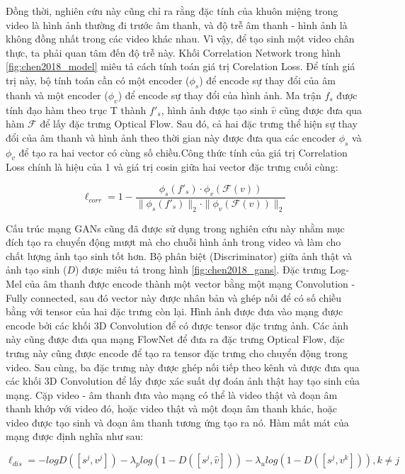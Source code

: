 Đồng thời, nghiên cứu này cũng chỉ ra rằng đặc tính của khuôn miệng trong video là hình ảnh thường đi trước âm thanh, và độ trễ âm thanh - hình ảnh là không đồng nhất trong các video khác nhau. Vì vậy, để tạo sinh một video chân thực, ta phải quan tâm đến độ trễ này. Khối Correlation Network trong hình \ref{fig:chen2018_model} miêu tả cách tính toán giá trị Corelation Loss. Để tính giá trị này, bộ tính toán cần có một encoder ($\phi_s$) để encode sự thay đổi của âm thanh và một encoder ($\phi_v$) để encode sự thay đổi của hình ảnh. Ma trận $f_s$ được tính đạo hàm theo trục T thành $f'_s$, hình ảnh được tạo sinh $\hat{v}$ cũng được đưa qua hàm $\mathcal{F}$ để lấy đặc trưng Optical Flow. Sau đó, cả hai đặc trưng thể hiện sự thay đổi của âm thanh và hình ảnh theo thời gian này được đưa qua các encoder $\phi_s$ và $\phi_v$ để tạo ra hai vector có cùng số chiều.Công thức tính của giá trị Correlation Loss chính là hiệu của 1 và giá trị cosin giữa hai vector đặc trưng cuối cùng:

\begin{equation}
    \ell_{corr} = 1 - \frac{\phi_s(f'_s)\cdot\phi_v(\mathcal{F}(v))}{\|\phi_s(f'_s)\|_2\cdot\|\phi_v(\mathcal{F}(v))\|_2}
    \label{eqn:chen2018_corr_loss}
\end{equation}


Cấu trúc mạng GANs cũng đã được sử dụng trong nghiên cứu này nhằm mục đích tạo ra chuyển động mượt mà cho chuỗi hình ảnh trong video và làm cho chất lượng ảnh tạo sinh tốt hơn. Bộ phân biệt (Discriminator) giữa ảnh thật và ảnh tạo sinh ($D$) được miêu tả trong hình \ref{fig:chen2018_gans}. Đặc trưng Log-Mel của âm thanh được encode thành một vector bằng một mạng Convolution - Fully connected, sau đó vector này được nhân bản và ghép nối để có số chiều bằng với tensor của hai đặc trưng còn lại. Hình ảnh được đưa vào mạng được encode bởi các khối 3D Convolution để có được tensor đặc trưng ảnh. Các ảnh này cũng được đưa qua mạng FlowNet để đưa ra đặc trưng Optical Flow, đặc trưng này cũng được encode để tạo ra tensor đặc trưng cho chuyển động trong video. Sau cùng, ba đặc trưng này được ghép nối tiếp theo kênh và được đưa qua các khối 3D Convolution để lấy được xác suất dự đoán ảnh thật hay tạo sinh của mạng. Cặp video - âm thanh đưa vào mạng có thể là video thật và đoạn âm thanh khớp với video đó, hoặc video thật và một đoạn âm thanh khác, hoặc video được tạo sinh và đoạn âm thanh tương ứng tạo ra nó. Hàm mất mát của mạng được định nghĩa như sau:

\begin{equation}
    \ell_{dis} = -logD([s^j, v^j]) - \lambda_plog(1 - D([s^j, \hat{v}])) - \lambda_ulog(1 - D([s^j, v^k])), k \ne j
\end{equation}

